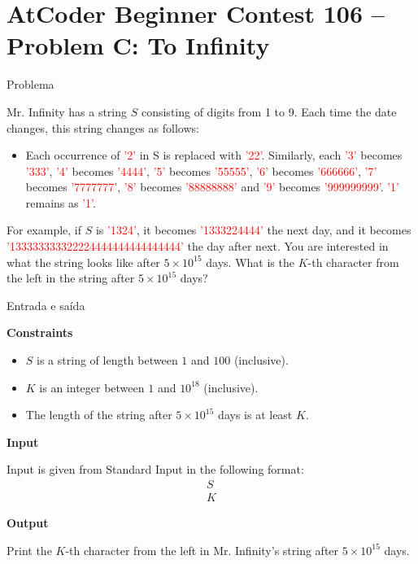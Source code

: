 \section{AtCoder Beginner Contest 106 -- Problem C: To Infinity}

\begin{frame}[fragile]{Problema}

Mr. Infinity has a string $S$ consisting of digits from 1 to 9. Each time the date changes, this 
string changes as follows:

\begin{itemize}
    \item Each occurrence of \textcolor{red}{'2'} in S is replaced with \textcolor{red}{'22'}. Similarly, each \textcolor{red}{'3'} becomes \textcolor{red}{'333'}, \textcolor{red}{'4'} becomes \textcolor{red}{'4444'}, \textcolor{red}{'5'} becomes \textcolor{red}{'55555'}, \textcolor{red}{'6'} becomes \textcolor{red}{'666666'}, \textcolor{red}{'7'} becomes \textcolor{red}{'7777777'}, \textcolor{red}{'8'} becomes \textcolor{red}{'88888888'} and \textcolor{red}{'9'} becomes \textcolor{red}{'999999999'}. \textcolor{red}{'1'} remains as \textcolor{red}{'1'}.
\end{itemize}

For example, if $S$ is \textcolor{red}{'1324'}, it becomes \textcolor{red}{'1333224444'} the next day, and it becomes \textcolor{red}{'133333333322224444444444444444'} the day after next. You are interested in what the string looks like after $5\times 10^{15}$ days. What is the $K$-th character 
from the left in the string after $5\times 10^{15}$ days?

\end{frame}

\begin{frame}[fragile]{Entrada e saída}

\textbf{Constraints}

\begin{itemize}
    \item $S$ is a string of length between $1$ and $100$ (inclusive).
    \item $K$ is an integer between $1$ and $10^{18}$ (inclusive).
    \item The length of the string after $5\times 10^{15}$ days is at least $K$.
\end{itemize}

\textbf{Input}

Input is given from Standard Input in the following format:
\begin{align*}
S\\
K
\end{align*}

\textbf{Output}

Print the $K$-th character from the left in Mr. Infinity's string after $5\times 10^{15}$ days.

\end{frame}

